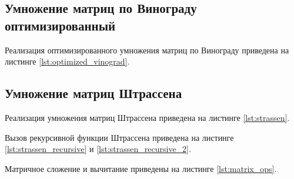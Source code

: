 \subsection{Умножение матриц по Винограду оптимизированный}
Реализация оптимизированного умножения матриц по Винограду приведена на листинге \ref{lst:optimized_vinograd}.
\newpage

\subsection{Умножение матриц Штрассена}
Реализация умножения матриц Штрассена приведена на листинге \ref{lst:strassen}.
\newpage

Вызов рекурсивной функции Штрассена приведена на листинге \ref{lst:strassen_recursive} и \ref{lst:strassen_recursive_2}.


Матричное сложение и вычитание приведены на листинге \ref{lst:matrix_ops}.


